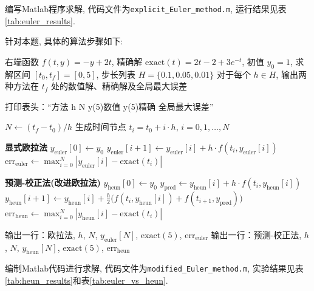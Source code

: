 \documentclass[zihao=-4,a4paper]{ctexart}
\begin{document}
编写Matlab程序求解, 代码文件为\verb|explicit_Euler_method.m|, 运行结果见表\ref{tab:euler_results}.


针对本题, 具体的算法步骤如下:
\begin{center}
\begin{minipage}{0.9\textwidth}
\begin{algorithm}[H]
\caption{显式欧拉法与预测-校正法对比求解 $y' = -y + 2t$, $y(0)=1$, $t\in[0,5]$}
\begin{algorithmic}[1]
\Require 右端函数 $f(t,y)=-y+2t$, 精确解 $\text{exact}(t)=2t-2+3e^{-t}$, 初值 $y_0=1$, 
        求解区间 $[t_0,t_f]=[0,5]$, 步长列表 $H=\{0.1,0.05,0.01\}$
\Ensure 对于每个 $h\in H$, 输出两种方法在 $t_f$ 处的数值解、精确解及全局最大误差

\State 打印表头：“方法        h        N      y(5)数值    y(5)精确    全局最大误差”

    \State $N \gets (t_f - t_0)/h$
    \State 生成时间节点 $t_i = t_0 + i\cdot h$, $i=0,1,\dots,N$
    
    \State \textbf{显式欧拉法}
    \State $y_{\text{euler}}[0] \gets y_0$
        \State $y_{\text{euler}}[i+1] \gets y_{\text{euler}}[i] + h \cdot f(t_i, y_{\text{euler}}[i])$
    \EndFor
    \State $\text{err}_{\text{euler}} \gets \max_{i=0}^{N} |y_{\text{euler}}[i] - \text{exact}(t_i)|$
    
    \State \textbf{预测-校正法(改进欧拉法)}
    \State $y_{\text{heun}}[0] \gets y_0$
        \State $y_{\text{pred}} \gets y_{\text{heun}}[i] + h \cdot f(t_i, y_{\text{heun}}[i])$ 
        \State $y_{\text{heun}}[i+1] \gets y_{\text{heun}}[i] + \frac{h}{2}\bigl(f(t_i, y_{\text{heun}}[i]) + f(t_{i+1}, y_{\text{pred}})\bigr)$ 
    \EndFor
    \State $\text{err}_{\text{heun}} \gets \max_{i=0}^{N} |y_{\text{heun}}[i] - \text{exact}(t_i)|$
    
    \State 输出一行：欧拉法, $h$, $N$, $y_{\text{euler}}[N]$, $\text{exact}(5)$, $\text{err}_{\text{euler}}$
    \State 输出一行：预测-校正法, $h$, $N$, $y_{\text{heun}}[N]$, $\text{exact}(5)$, $\text{err}_{\text{heun}}$
\EndFor
\end{algorithmic}
\end{algorithm}
\end{minipage}
\end{center}

编制Matlab代码进行求解, 代码文件为\verb|modified_Euler_method.m|, 实验结果见表\ref{tab:heun_results}和表\ref{tab:euler_vs_heun}.
\end{document}
